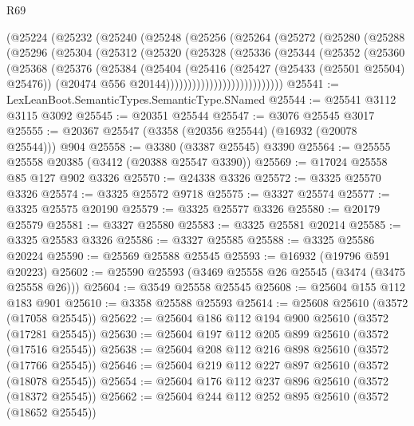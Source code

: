 \begin{lexlean}{R69}
\begin{coremodule}
          (@25224
            (@25232
              (@25240
                (@25248
                  (@25256
                    (@25264
                      (@25272
                        (@25280
                          (@25288
                            (@25296
                              (@25304
                                (@25312
                                  (@25320
                                    (@25328
                                      (@25336
                                        (@25344
                                          (@25352
                                            (@25360
                                              (@25368
                                                (@25376
                                                  (@25384
                                                    (@25404
                                                      (@25416
                                                        (@25427 (@25433 (@25501 @25504) @25476))
                                                        (@20474
                                                          @556
                                                          @20144)))))))))))))))))))))))))))
@25541 := LexLeanBoot.SemanticTypes.SemanticType.SNamed
@25544 := @25541 @3112 @3115 @3092
@25545 := @20351 @25544
@25547 := @3076 @25545 @3017
@25555 := @20367 @25547 (@3358 (@20356 @25544) (@16932 (@20078 @25544))) @904
@25558 := @3380 (@3387 @25545) @3390
@25564 := @25555 @25558 @20385 (@3412 (@20388 @25547 @3390))
@25569 := @17024 @25558 @85 @127 @902 @3326
@25570 := @24338 @3326
@25572 := @3325 @25570 @3326
@25574 := @3325 @25572 @9718
@25575 := @3327 @25574
@25577 := @3325 @25575 @20190
@25579 := @3325 @25577 @3326
@25580 := @20179 @25579
@25581 := @3327 @25580
@25583 := @3325 @25581 @20214
@25585 := @3325 @25583 @3326
@25586 := @3327 @25585
@25588 := @3325 @25586 @20224
@25590 := @25569 @25588 @25545
@25593 := @16932 (@19796 @591 @20223)
@25602 := @25590 @25593 (@3469 @25558 @26 @25545 (@3474 (@3475 @25558 @26)))
@25604 := @3549 @25558 @25545
@25608 := @25604 @155 @112 @183 @901
@25610 := @3358 @25588 @25593
@25614 := @25608 @25610 (@3572 (@17058 @25545))
@25622 := @25604 @186 @112 @194 @900 @25610 (@3572 (@17281 @25545))
@25630 := @25604 @197 @112 @205 @899 @25610 (@3572 (@17516 @25545))
@25638 := @25604 @208 @112 @216 @898 @25610 (@3572 (@17766 @25545))
@25646 := @25604 @219 @112 @227 @897 @25610 (@3572 (@18078 @25545))
@25654 := @25604 @176 @112 @237 @896 @25610 (@3572 (@18372 @25545))
@25662 := @25604 @244 @112 @252 @895 @25610 (@3572 (@18652 @25545))

\end{coremodule}
\end{lexlean}
